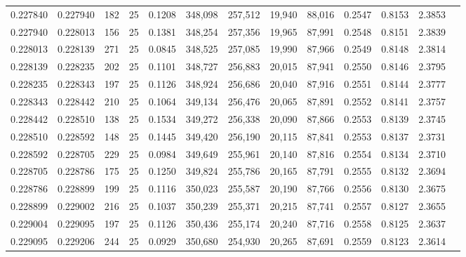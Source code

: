 \begin{tabular}{rrrrrrrrrrrrr}
0.227840 & 0.227940 &   182 &  25 &                                     0.1208 & 348,098 & 257,512 &  19,940 &  88,016 & 0.2547 & 0.8153 & 2.3853 \\
0.227940 & 0.228013 &   156 &  25 &                                     0.1381 & 348,254 & 257,356 &  19,965 &  87,991 & 0.2548 & 0.8151 & 2.3839 \\
0.228013 & 0.228139 &   271 &  25 &                                     0.0845 & 348,525 & 257,085 &  19,990 &  87,966 & 0.2549 & 0.8148 & 2.3814 \\
0.228139 & 0.228235 &   202 &  25 &                                     0.1101 & 348,727 & 256,883 &  20,015 &  87,941 & 0.2550 & 0.8146 & 2.3795 \\
0.228235 & 0.228343 &   197 &  25 &                                     0.1126 & 348,924 & 256,686 &  20,040 &  87,916 & 0.2551 & 0.8144 & 2.3777 \\
0.228343 & 0.228442 &   210 &  25 &                                     0.1064 & 349,134 & 256,476 &  20,065 &  87,891 & 0.2552 & 0.8141 & 2.3757 \\
0.228442 & 0.228510 &   138 &  25 &                                     0.1534 & 349,272 & 256,338 &  20,090 &  87,866 & 0.2553 & 0.8139 & 2.3745 \\
0.228510 & 0.228592 &   148 &  25 &                                     0.1445 & 349,420 & 256,190 &  20,115 &  87,841 & 0.2553 & 0.8137 & 2.3731 \\
0.228592 & 0.228705 &   229 &  25 &                                     0.0984 & 349,649 & 255,961 &  20,140 &  87,816 & 0.2554 & 0.8134 & 2.3710 \\
0.228705 & 0.228786 &   175 &  25 &                                     0.1250 & 349,824 & 255,786 &  20,165 &  87,791 & 0.2555 & 0.8132 & 2.3694 \\
0.228786 & 0.228899 &   199 &  25 &                                     0.1116 & 350,023 & 255,587 &  20,190 &  87,766 & 0.2556 & 0.8130 & 2.3675 \\
0.228899 & 0.229002 &   216 &  25 &                                     0.1037 & 350,239 & 255,371 &  20,215 &  87,741 & 0.2557 & 0.8127 & 2.3655 \\
0.229004 & 0.229095 &   197 &  25 &                                     0.1126 & 350,436 & 255,174 &  20,240 &  87,716 & 0.2558 & 0.8125 & 2.3637 \\
0.229095 & 0.229206 &   244 &  25 &                                     0.0929 & 350,680 & 254,930 &  20,265 &  87,691 & 0.2559 & 0.8123 & 2.3614 \\

\end{tabular}
